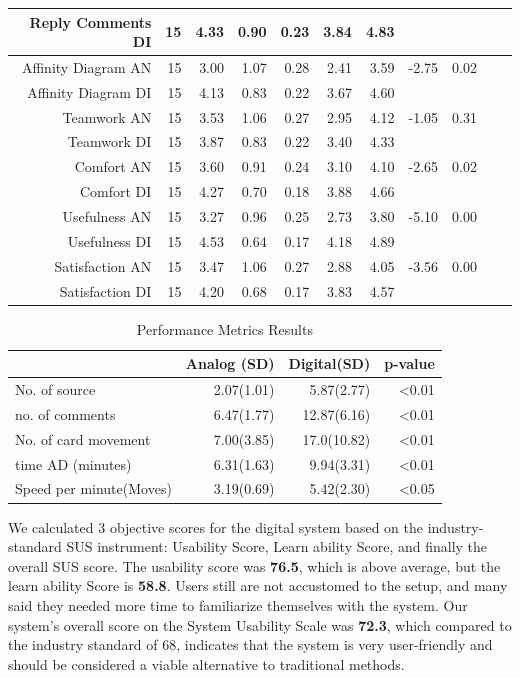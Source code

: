 \documentclass{sigchi}
\begin{document}
\begin{table}[ht]
\begin{tabular}{rrrrrrrrrrr}
  Reply Comments  DI & 15 & 4.33 & 0.90 & 0.23 & 3.84 & 4.83 &  &  \\ 
    \hline
  Affinity Diagram AN & 15 & 3.00 & 1.07 & 0.28 & 2.41 & 3.59 & -2.75   & 0.02 \\ 
  Affinity Diagram DI & 15 & 4.13 & 0.83 & 0.22 & 3.67 & 4.60 &  &  \\ 
  \hline
  Teamwork AN & 15 & 3.53 & 1.06 & 0.27 & 2.95 & 4.12 & -1.05   & 0.31 \\ 
  Teamwork DI & 15 & 3.87 & 0.83 & 0.22 & 3.40 & 4.33 &   &  \\ 
  \hline
  Comfort AN & 15 & 3.60 & 0.91 & 0.24 & 3.10 & 4.10 & -2.65   & 0.02 \\ 
  Comfort DI & 15 & 4.27 & 0.70 & 0.18 & 3.88 & 4.66 &  &  \\ 
  \hline
  Usefulness AN & 15 & 3.27 & 0.96 & 0.25 & 2.73 & 3.80 & -5.10 & 0.00 \\ 
  Usefulness DI & 15 & 4.53 & 0.64 & 0.17 & 4.18 & 4.89 &   &  \\ 
  \hline
  Satisfaction AN & 15 & 3.47 & 1.06 & 0.27 & 2.88 & 4.05 & -3.56   & 0.00 \\ 
  Satisfaction DI & 15 & 4.20 & 0.68 & 0.17 & 3.83 & 4.57 &    &  \\ 
   \hline
\end{tabular}
\end{table}


\begin{table}
\centering
\caption {Performance Metrics Results}
\begin{tabular}{lrrr}
  \hline
& Analog (SD) & Digital(SD) & p-value \\ 
  \hline
  \hline
No. of source  & 2.07(1.01)  &    5.87(2.77)    &  \textless0.01    \\
no. of comments & 6.47(1.77)  &    12.87(6.16)    &  \textless0.01    \\
No. of card movement  &    7.00(3.85)& 17.0(10.82)   &  \textless0.01    \\
time AD (minutes) &    6.31(1.63)   &      9.94(3.31)      &   \textless0.01    \\ 
Speed per minute(Moves)  &    3.19(0.69)   &      5.42(2.30)      &   \textless0.05    \\ 
\hline
\end{tabular}
\end{table}


We calculated 3 objective scores for the digital system based on the industry-standard SUS instrument: Usability Score, Learn ability Score, and finally the overall SUS score. The usability score was \textbf{76.5}, which is above average, but the learn ability Score is \textbf{58.8}. Users still are not accustomed to the setup, and many said they needed more time to familiarize themselves with the system. Our system's overall score on the System Usability Scale was \textbf{72.3}, which compared to the industry standard of 68, indicates that the system is very user-friendly and should be considered a viable alternative to traditional methods. 
\end{document}

